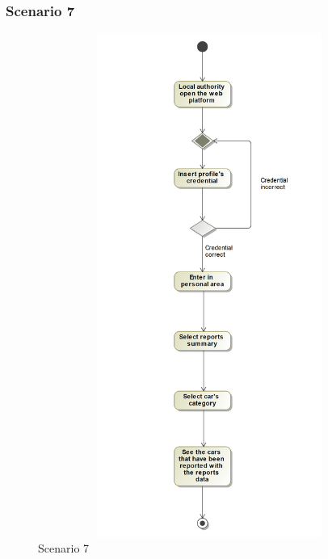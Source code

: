 \subsubsection{Scenario 7}
\begin{figure}[H]
	\begin{minipage}[b]{0.40\textwidth}
		\includegraphics[width=12cm,height=16.5cm]{Images/ActivityRASD/Scenario7.png}
		\caption{Scenario 7}
	\end{minipage}
\end{figure}
\newpage
